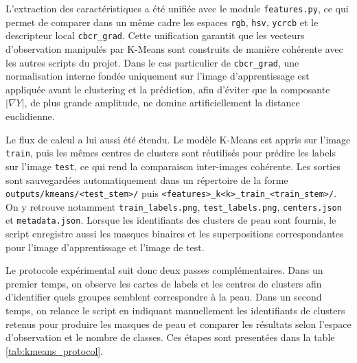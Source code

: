 L'extraction des caract\'eristiques a \'et\'e unifi\'ee avec le module \texttt{features.py}, ce qui permet de comparer dans un m\^eme cadre les espaces \texttt{rgb}, \texttt{hsv}, \texttt{ycrcb} et le descripteur local \texttt{cbcr\_grad}. Cette unification garantit que les vecteurs d'observation manipul\'es par K-Means sont construits de mani\`ere coh\'erente avec les autres scripts du projet. Dans le cas particulier de \texttt{cbcr\_grad}, une normalisation interne fond\'ee uniquement sur l'image d'apprentissage est appliqu\'ee avant le clustering et la pr\'ediction, afin d'\'eviter que la composante \(|\nabla Y|\), de plus grande amplitude, ne domine artificiellement la distance euclidienne.

Le flux de calcul a lui aussi \'et\'e \'etendu. Le mod\`ele K-Means est appris sur l'image \texttt{train}, puis les m\^emes centres de clusters sont r\'eutilis\'es pour pr\'edire les labels sur l'image \texttt{test}, ce qui rend la comparaison inter-images coh\'erente. Les sorties sont sauvegard\'ees automatiquement dans un r\'epertoire de la forme \texttt{outputs/kmeans/<test\_stem>/} puis \texttt{<features>\_k<k>\_train\_<train\_stem>/}. On y retrouve notamment \texttt{train\_labels.png}, \texttt{test\_labels.png}, \texttt{centers.json} et \texttt{metadata.json}. Lorsque les identifiants des clusters de peau sont fournis, le script enregistre aussi les masques binaires et les superpositions correspondantes pour l'image d'apprentissage et l'image de test.

Le protocole exp\'erimental suit donc deux passes compl\'ementaires. Dans un premier temps, on observe les cartes de labels et les centres de clusters afin d'identifier quels groupes semblent correspondre \`a la peau. Dans un second temps, on relance le script en indiquant manuellement les identifiants de clusters retenus pour produire les masques de peau et comparer les r\'esultats selon l'espace d'observation et le nombre de classes. Ces étapes sont presentées dans la table \ref{tab:kmeans_protocol}.

